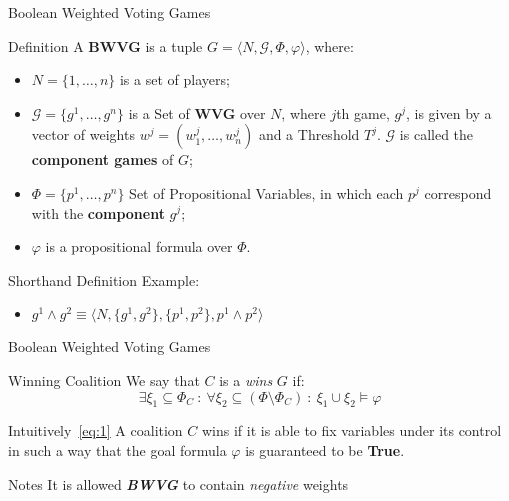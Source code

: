 \documentclass{beamer}
\begin{document}
\begin{frame}[fragile]{Boolean Weighted Voting Games}
  \begin{block}{Definition}
    A \textbf{BWVG} is a tuple $G = \langle N, \mathcal{G}, \Phi, \varphi \rangle$, where:
    \begin{itemize}
      \item $N = \{1,\dots,n\}$ is a set of players;
      \item $\mathcal{G} = \{g^1, \dots, g^n\}$ is a Set of \textbf{WVG} over $N$, where $j$th game, $g^j$, is
      given by a vector of weights $w^j = (w_1^j, \dots, w_n^j)$ and a Threshold $T^j$. $\mathcal{G}$ is called the \textbf{component games} of $G$;
      \item $\Phi = \{p^1, \dots, p^n\}$ Set of Propositional Variables, in which each $p^j$ correspond with the \textbf{component} $g^j$;
      \item $\varphi$ is a propositional formula over $\Phi$. 
    \end{itemize}
  \end{block}
  \begin{block}{Shorthand Definition}
    Example:
    \begin{itemize}
      \item $g^1 \land g^2 \equiv \langle N, \{g^1,g^2\}, \{p^1, p^2\}, p^1 \land p^2 \rangle$
    \end{itemize}
  \end{block}
\end{frame}

\begin{frame}[fragile]{Boolean Weighted Voting Games}
  \begin{block}{Winning Coalition}
    We say that $C$ is a \textit{wins} $G$ if:
    \begin{equation}
      \exists \xi_1 \subseteq \Phi_C\ :\ \forall \xi_2 \subseteq (\Phi \setminus \Phi_C)\ :\ \xi_1 \cup \xi_2 \models \varphi \label{eq:1}
    \end{equation}
  \end{block}
  \begin{block}{Intuitively~\ref{eq:1}}
    A coalition $C$ wins if it is able to fix variables under its control in such a way that the goal formula $\varphi$ is guaranteed to be \textbf{True}.
  \end{block}
  \begin{block}{Notes}
    It is allowed \textbf{\textit{BWVG}} to contain \textit{negative} weights
  \end{block}
\end{frame}
\end{document}
